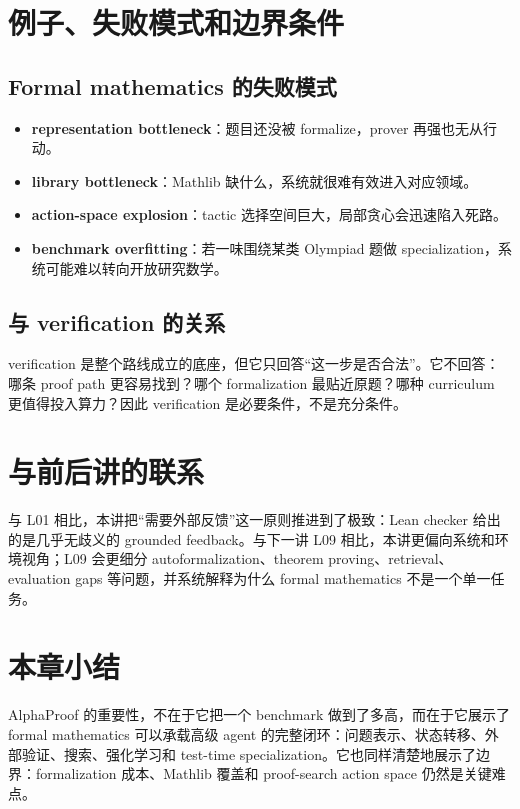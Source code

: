 \documentclass[a4paper]{article}
\begin{document}
\section{例子、失败模式和边界条件}

\subsection{Formal mathematics 的失败模式}

\begin{itemize}
\item \textbf{representation bottleneck}：题目还没被 formalize，prover 再强也无从行动。
\item \textbf{library bottleneck}：Mathlib 缺什么，系统就很难有效进入对应领域。
\item \textbf{action-space explosion}：tactic 选择空间巨大，局部贪心会迅速陷入死路。
\item \textbf{benchmark overfitting}：若一味围绕某类 Olympiad 题做 specialization，系统可能难以转向开放研究数学。
\end{itemize}

\subsection{与 verification 的关系}

verification 是整个路线成立的底座，但它只回答“这一步是否合法”。它不回答：哪条 proof path 更容易找到？哪个 formalization 最贴近原题？哪种 curriculum 更值得投入算力？因此 verification 是必要条件，不是充分条件。

\section{与前后讲的联系}

与 L01 相比，本讲把“需要外部反馈”这一原则推进到了极致：Lean checker 给出的是几乎无歧义的 grounded feedback。与下一讲 L09 相比，本讲更偏向系统和环境视角；L09 会更细分 autoformalization、theorem proving、retrieval、evaluation gaps 等问题，并系统解释为什么 formal mathematics 不是一个单一任务。

\section{本章小结}

AlphaProof 的重要性，不在于它把一个 benchmark 做到了多高，而在于它展示了 formal mathematics 可以承载高级 agent 的完整闭环：问题表示、状态转移、外部验证、搜索、强化学习和 test-time specialization。它也同样清楚地展示了边界：formalization 成本、Mathlib 覆盖和 proof-search action space 仍然是关键难点。
\end{document}
